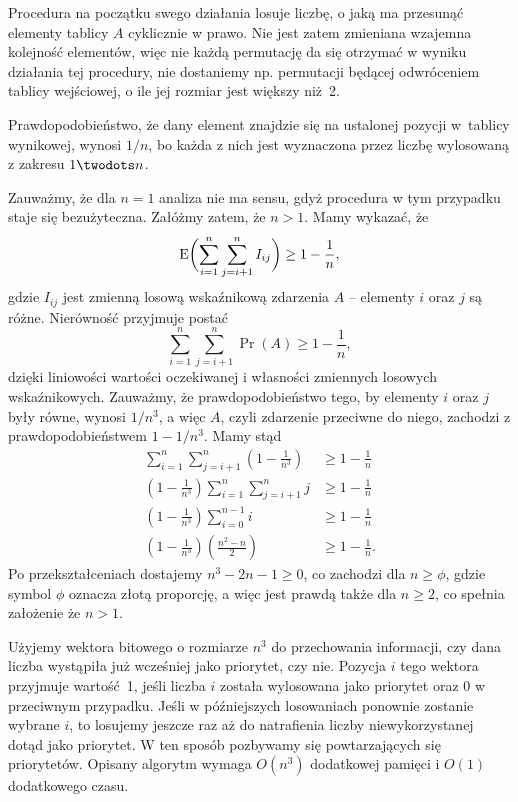 \exercise{} %
\noindent Procedura na początku swego działania losuje liczbę, o jaką ma przesunąć elementy tablicy $A$ cyklicznie w prawo. Nie jest zatem zmieniana wzajemna kolejność elementów, więc nie każdą permutację da się otrzymać w wyniku działania tej procedury, nie dostaniemy np. permutacji będącej odwróceniem tablicy wejściowej, o ile jej rozmiar jest większy niż~2.

Prawdopodobieństwo, że dany element znajdzie się na ustalonej pozycji w~tablicy wynikowej, wynosi $1/n$, bo każda z nich jest wyznaczona przez liczbę wylosowaną z zakresu $1\twodots n$.

\exercise{} %
\noindent Zauważmy, że dla $n=1$ analiza nie ma sensu, gdyż procedura  w tym przypadku staje się bezużyteczna. Załóżmy zatem, że $n>1$. Mamy wykazać, że
\[
	\operatorname{E}\biggl(\sum_{i=1}^n\sum_{j=i+1}^nI_{ij}\biggr) \ge 1-\frac{1}{n},
\]
gdzie $I_{ij}$ jest zmienną losową wskaźnikową zdarzenia $A$ -- elementy $i$ oraz $j$ są różne. Nierówność przyjmuje postać
\[
	\sum_{i=1}^n\sum_{j=i+1}^n\Pr(A) \ge 1-\frac{1}{n},
\]
dzięki liniowości wartości oczekiwanej i własności zmiennych losowych wskaźnikowych. Zauważmy, że prawdopodobieństwo tego, by elementy $i$ oraz $j$ były równe, wynosi $1/n^3$, a więc $A$, czyli zdarzenie przeciwne do niego, zachodzi z prawdopodobieństwem $1-1/n^3$. Mamy stąd
\begin{align*}
	\sum_{i=1}^n\sum_{j=i+1}^n\left(1-\frac{1}{n^3}\right) &\ge 1-\frac{1}{n} \\
	\left(1-\frac{1}{n^3}\right)\sum_{i=1}^n\sum_{j=i+1}^nj &\ge 1-\frac{1}{n} \\
	\left(1-\frac{1}{n^3}\right)\sum_{i=0}^{n-1}i &\ge 1-\frac{1}{n} \\
	\left(1-\frac{1}{n^3}\right)\left(\frac{n^2-n}{2}\right) &\ge 1-\frac{1}{n}.
\end{align*}
Po przekształceniach dostajemy $n^3-2n-1\ge0$, co zachodzi dla $n\ge\phi$, gdzie symbol $\phi$ oznacza złotą proporcję, a więc jest prawdą także dla $n\ge2$, co spełnia założenie że $n>1$.

\exercise{} %
\noindent Użyjemy wektora bitowego o rozmiarze $n^3$ do przechowania informacji, czy dana liczba wystąpiła już wcześniej jako priorytet, czy nie. Pozycja $i$ tego wektora przyjmuje wartość~1, jeśli liczba $i$ została wylosowana jako priorytet oraz 0 w przeciwnym przypadku. Jeśli w późniejszych losowaniach ponownie zostanie wybrane $i$, to losujemy jeszcze raz aż do natrafienia liczby niewykorzystanej dotąd jako priorytet. W ten sposób pozbywamy się powtarzających się priorytetów. Opisany algorytm wymaga $O(n^3)$ dodatkowej pamięci i $O(1)$ dodatkowego czasu.

